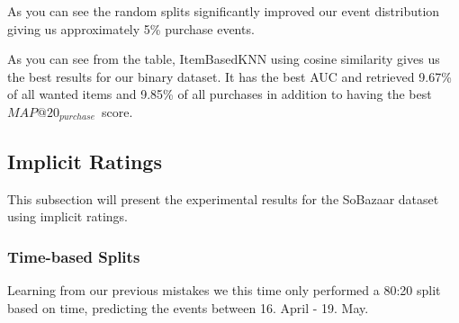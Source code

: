 
As you can see the random splits significantly improved our event distribution giving us approximately 5\% purchase events.

As you can see from the table, ItemBasedKNN using cosine similarity gives us the best results for our binary dataset. It has the best AUC and retrieved 9.67\% of all wanted items and 9.85\% of all purchases
in addition to having the best $MAP@20_{purchase}$ score.





\subsection{Implicit Ratings}

This subsection will present the experimental results for the SoBazaar dataset using implicit ratings.


\subsubsection{Time-based Splits}

Learning from our previous mistakes we this time only performed a 80:20 split based on time, predicting the events between 16. April - 19. May.

